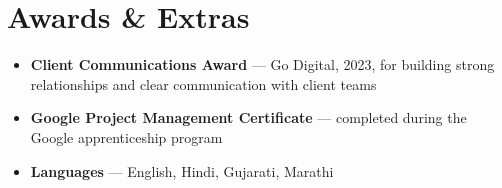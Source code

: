 \documentclass[11pt, a4paper]{article}
\begin{document}
\section{Awards \& Extras}

\begin{itemize}[leftmargin=1.2em, itemsep=2pt, parsep=0pt, topsep=2pt]
    \item \textbf{Client Communications Award} --- Go Digital, 2023, for building strong relationships and clear communication with client teams
    \item \textbf{Google Project Management Certificate} --- completed during the Google apprenticeship program
    \item \textbf{Languages} --- English, Hindi, Gujarati, Marathi
\end{itemize}
\end{document}
